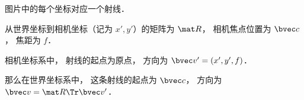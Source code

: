 
\begin{issues}
\issueDraft
\end{issues}


图片中的每个坐标对应一个射线．

从世界坐标到相机坐标（记为 $x', y'$）的矩阵为 $\mat R$， 相机焦点位置为 $\bvec c$， 焦距为 $f$．

相机坐标系中， 射线的起点为原点， 方向为 $\bvec v' = (x', y', f)$．

那么在世界坐标系中， 这条射线的起点为 $\bvec c$， 方向为 $\bvec v = \mat R\Tr \bvec v'$．
